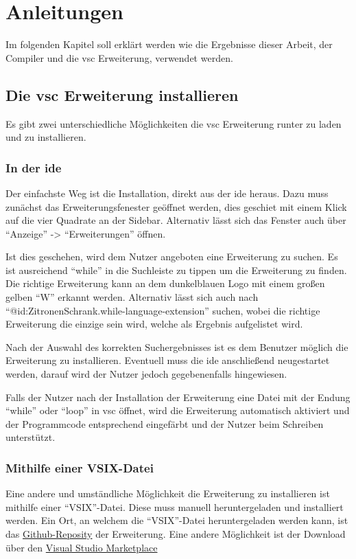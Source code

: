 \chapter{Anleitungen}
Im folgenden Kapitel soll erklärt werden wie die Ergebnisse dieser Arbeit, der Compiler und die \ac{vsc} Erweiterung, verwendet werden.

\section{Die \acs{vsc} Erweiterung installieren}
Es gibt zwei unterschiedliche Möglichkeiten die \ac{vsc} Erweiterung runter zu laden und zu installieren.

\subsection{In der \acs{ide}} 
Der einfachste Weg ist die Installation, direkt aus der \ac{ide} heraus. Dazu muss zunächst das Erweiterungsfenester geöffnet werden, dies geschiet mit einem Klick auf die vier Quadrate an der Sidebar. Alternativ lässt sich das Fenster auch über \enquote{Anzeige} -> \enquote{Erweiterungen} öffnen.

Ist dies geschehen, wird dem Nutzer angeboten eine Erweiterung zu suchen. Es ist ausreichend \enquote{while} in die Suchleiste zu tippen um die Erweiterung zu finden. Die richtige Erweiterung kann an dem dunkelblauen Logo mit einem großen gelben \enquote{W} erkannt werden. Alternativ lässt sich auch nach \enquote{@id:ZitronenSchrank.while-language-extension} suchen, wobei die richtige Erweiterung die einzige sein wird, welche als Ergebnis aufgelistet wird. 

Nach der Auswahl des korrekten Suchergebnisses ist es dem Benutzer möglich die Erweiterung zu installieren. Eventuell muss die \ac{ide} anschließend neugestartet werden, darauf wird der Nutzer jedoch gegebenenfalls hingewiesen.

Falls der Nutzer nach der Installation der Erweiterung eine Datei mit der Endung \enquote{while} oder \enquote{loop} in \ac{vsc} öffnet, wird die Erweiterung automatisch aktiviert und der Programmcode entsprechend eingefärbt und der Nutzer beim Schreiben unterstützt.

\subsection{Mithilfe einer VSIX-Datei}
Eine andere und umständliche Möglichkeit die Erweiterung zu installieren ist mithilfe einer \enquote{VSIX}-Datei. Diese muss manuell heruntergeladen und installiert werden. Ein Ort, an welchem die \enquote{VSIX}-Datei heruntergeladen werden kann, ist das \href{https://github.com/ZitronenSchrank/While-Extension-VsCode}{Github-Reposity} der Erweiterung. Eine andere Möglichkeit ist der Download über den \href{https://marketplace.visualstudio.com/items?itemName=ZitronenSchrank.while-language-extension}{Visual Studio Marketplace}

